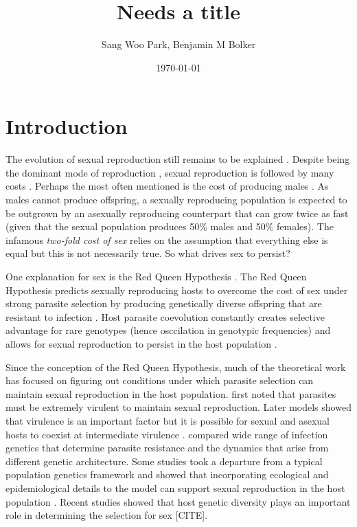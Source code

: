 \documentclass{article}\usepackage[]{graphicx}\usepackage[]{color}
\title{Needs a title}
\author{Sang Woo Park, Benjamin M Bolker}
\date{\today}
\begin{document}
\maketitle

\section{Introduction}

The evolution of sexual reproduction still remains to be explained \citep{otto2009evolutionary}.
Despite being the dominant mode of reproduction \citep{vrijenhoek1998animal}, sexual reproduction is followed by many costs \citep{lehtonen2012many}.
Perhaps the most often mentioned is the cost of producing males \citep{smith1978evolution}.
As males cannot produce offspring, a sexually reproducing population is expected to be outgrown by an asexually reproducing counterpart that can grow twice as fast (given that the sexual population produces 50\% males and 50\% females).
The infamous \emph{two-fold cost of sex} \citep{smith1978evolution} relies on the assumption that everything else is equal but this is not necessarily true.
So what drives sex to persist?

One explanation for sex is the Red Queen Hypothesis \citep{bell1982masterpiece}.
The Red Queen Hypothesis predicts sexually reproducing hosts to overcome the cost of sex under strong parasite selection by producing genetically diverse offspring that are resistant to infection \citep{jbs1949disease, jaenike1978hypothesis, hamilton1980sex}.
Host parasite coevolution constantly creates selective advantage for rare genotypes (hence osccilation in genotypic frequencies) and allows for sexual reproduction to persist in the host population \citep{clarke1976ecological, hamilton1980sex}.

Since the conception of the Red Queen Hypothesis, much of the theoretical work has focused on figuring out conditions under which parasite selection can maintain sexual reproduction in the host population.
\cite{may1983epidemiology} first noted that parasites must be extremely virulent to maintain sexual reproduction.
Later models showed that virulence is an important factor but it is possible for sexual and asexual hosts to coexist at intermediate virulence \citep{howard1994parasitism}.
\cite{agrawal2002infection} compared wide range of infection genetics that determine parasite resistance and the dynamics that arise from different genetic architecture.
Some studies took a departure from a typical population genetics framework and showed that incorporating ecological and epidemiological details to the model can support sexual reproduction in the host population \citep{galvani2001antigenic, galvani2003maintenance, lively2009maintenance, lively2010epidemiological}.
Recent studies showed that host genetic diversity plays an important role in determining the selection for sex [CITE].
\end{document}
